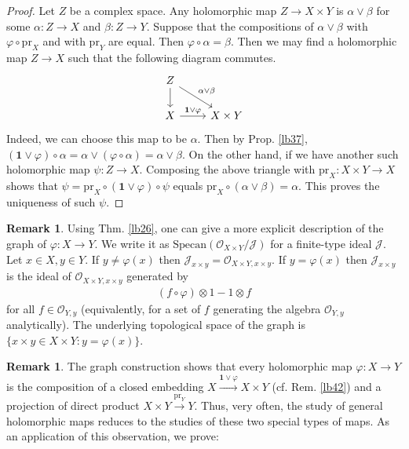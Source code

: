 \documentclass[12pt,b5paper,notitlepage]{report}
\theoremstyle{definition}
\newtheorem{rem}[df]{Remark}
\theoremstyle{plain}
\newcommand{\mc}{\mathcal}
\newcommand{\id}{\mathbf{1}}
\newcommand{\scr}{\mathscr}
\newcommand{\pr}{\mathrm {pr}}
\newcommand{\Specan}{\mathrm{Specan}}
\numberwithin{equation}{section}
\begin{document}
\begin{proof}
Let $Z$ be a complex space. Any holomorphic map $Z\rightarrow X\times Y$ is $\alpha\vee\beta$ for some $\alpha:Z\rightarrow X$ and $\beta:Z\rightarrow Y$. Suppose that the compositions of $\alpha\vee\beta$ with $\varphi\circ\pr_X$ and with $\pr_Y$ are equal. Then $\varphi\circ\alpha=\beta$. Then we may find a holomorphic map $Z\rightarrow X$ such that the following diagram commutes.
\begin{equation*}
\begin{tikzcd}
Z \arrow[d] \arrow[rd, "\alpha\vee\beta"] &           \\
X \arrow[r, "\id\vee\varphi"]             & X\times Y
\end{tikzcd}
\end{equation*}
Indeed, we can choose this map to be $\alpha$. Then by Prop. \ref{lb37}, $(\id\vee\varphi)\circ\alpha=\alpha\vee(\varphi\circ\alpha)=\alpha\vee\beta$. On the other hand, if we have another such holomorphic map $\psi:Z\rightarrow X$. Composing the above triangle with $\pr_X:X\times Y\rightarrow X$ shows that $\psi=\pr_X\circ(\id\vee\varphi)\circ\psi$ equals $\pr_X\circ (\alpha\vee\beta)=\alpha$. This proves the uniqueness of such $\psi$.
\end{proof}




\begin{rem}\label{lb15}
Using Thm. \ref{lb26}, one can give a more explicit description of the graph of $\varphi:X\rightarrow Y$. We write it as $\Specan(\scr O_{X\times Y}/\mc J)$ for a finite-type ideal $\mc J$. Let $x\in X,y\in Y$. If $y\neq\varphi(x)$ then $\mc J_{x\times y}=\scr O_{X\times Y,x\times y}$. If $y=\varphi(x)$ then $\mc J_{x\times y}$ is the ideal of $\scr O_{X\times Y,x\times y}$ generated by
\begin{align}
(f\circ\varphi)\otimes 1-1\otimes f
\end{align}
for all $f\in\scr O_{Y,y}$ (equivalently, for a set of $f$ generating the algebra $\scr O_{Y,y}$ analytically). The underlying topological space of the graph is $\{x\times y\in X\times Y:y=\varphi(x)\}$.
\end{rem}

\begin{rem}\label{lb40}
The graph construction shows that every holomorphic map $\varphi:X\rightarrow Y$ is the composition of a closed embedding $X\xrightarrow{\id\vee\varphi}X\times Y$ (cf. Rem. \ref{lb42}) and a projection of direct product $X\times Y\xrightarrow{\pr_Y}Y$. Thus, very often, the study of general holomorphic maps reduces to the studies of these two special types of maps. As an application of this observation, we prove:
\end{rem}
\end{document}
